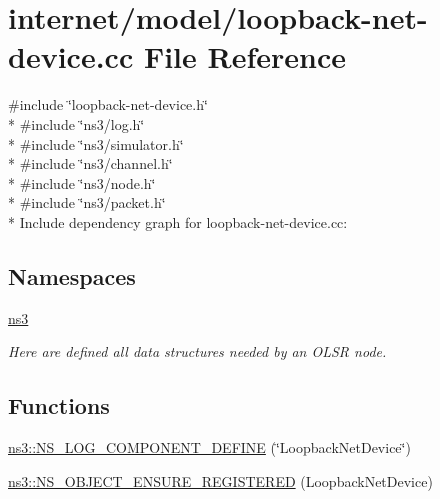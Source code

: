 \hypertarget{loopback-net-device_8cc}{}\section{internet/model/loopback-\/net-\/device.cc File Reference}
\label{loopback-net-device_8cc}
{\ttfamily \#include \char`\"{}loopback-\/net-\/device.\+h\char`\"{}}\\*
{\ttfamily \#include \char`\"{}ns3/log.\+h\char`\"{}}\\*
{\ttfamily \#include \char`\"{}ns3/simulator.\+h\char`\"{}}\\*
{\ttfamily \#include \char`\"{}ns3/channel.\+h\char`\"{}}\\*
{\ttfamily \#include \char`\"{}ns3/node.\+h\char`\"{}}\\*
{\ttfamily \#include \char`\"{}ns3/packet.\+h\char`\"{}}\\*
Include dependency graph for loopback-\/net-\/device.cc\+:
\subsection*{Namespaces}
\begin{DoxyCompactItemize}
\item 
 \hyperlink{namespacens3}{ns3}
\begin{DoxyCompactList}\small\item\em Here are defined all data structures needed by an O\+L\+SR node. \end{DoxyCompactList}\end{DoxyCompactItemize}
\subsection*{Functions}
\begin{DoxyCompactItemize}
\item 
\hyperlink{namespacens3_a59b6e21ec2060930db993f51bfbd069d}{ns3\+::\+N\+S\+\_\+\+L\+O\+G\+\_\+\+C\+O\+M\+P\+O\+N\+E\+N\+T\+\_\+\+D\+E\+F\+I\+NE} (\char`\"{}Loopback\+Net\+Device\char`\"{})
\item 
\hyperlink{namespacens3_ae6458e1fb8baf29e0aeacf8cd5ab123c}{ns3\+::\+N\+S\+\_\+\+O\+B\+J\+E\+C\+T\+\_\+\+E\+N\+S\+U\+R\+E\+\_\+\+R\+E\+G\+I\+S\+T\+E\+R\+ED} (Loopback\+Net\+Device)
\end{DoxyCompactItemize}
